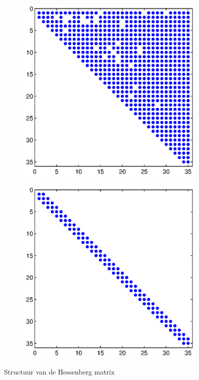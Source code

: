\documentclass[a4paper, 12pt, titlepage]{report}
\begin{document}
\begin{figure}[!h]
\begin{subfigure}{.5\textwidth}
\centering
\includegraphics[width=\textwidth]{structuur_hessenberg.eps}
\end{subfigure}
\begin{subfigure}{.5\textwidth}
\centering
\includegraphics[width=\textwidth]{afgerond.eps}
\end{subfigure}

\caption{Structuur van de Hessenberg matrix}
\label{hessenberg}
\end{figure}
\end{document}
